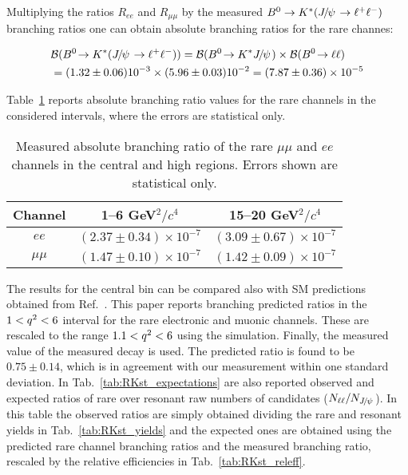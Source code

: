 Multiplying the ratios $R_{ee}$ and $R_{\mu\mu}$ by the measured $\Bz\to\Kstar (\jpsi\to\ell^+\ell^-)$~\cite{PDG2014}
branching ratios one can obtain absolute branching ratios for the rare channes:

\begin{equation}
\begin{split}
&\BR(\decay{\Bz}{\Kstar(\jpsi\to\ell^+\ell^-)}) = \BR(\decay{\Bz}{\Kstar\jpsi}) \times \BR(\decay{\Bz}{\ell\ell}) \\
& = (1.32 \pm 0.06) 10^{-3} \times (5.96 \pm 0.03) 10^{-2} = (7.87 \pm 0.36) \times 10^{-5}
\end{split}
\end{equation}

Table~\ref{tab:RKst_abs_BR} reports absolute branching ratio values for the rare channels in the considered 
\qsq intervals, where the errors are statistical only.

\begin{table}
\centering
\begin{tabular}{|c|c|c|}
\hline
 Channel 			& 1--6 GeV$^2/c^4$ & 15--20 GeV$^2/c^4$\\ \hline
$ee$ 	& $( 2.37  \pm  0.34 )\times 10^{-7}$ 	& $( 3.09  \pm  0.67 )\times 10^{-7}$ \\
 $\mu\mu$ 	& $( 1.47  \pm  0.10 )\times 10^{-7}$ 	& $( 1.42  \pm  0.09 )\times 10^{-7}$ \\
\hline 
 \end{tabular}
\caption{Measured absolute branching ratio of the rare $\mu\mu$ and $ee$ channels in
the central and high \qsq regions. Errors shown are statistical only. }
\label{tab:RKst_abs_BR}
\end{table}

The results for the central \qsq bin can be compared also with SM predictions obtained from Ref.~\cite{Ali:2002jg}.
This paper reports branching predicted ratios in the $1 < {q^2} < 6$ \gevgevcccc interval
for the rare electronic and muonic channels. These are rescaled to the range $1.1 < {q^2} < 6$ \gevgevcccc
using the simulation. Finally, the measured value of the measured \decay{\Bz}{\Kstar(\jpsi\to\ell^+\ell^-)}
decay is used. The predicted ratio is found to be $0.75 \pm 0.14$,
which is in agreement with our measurement within one standard deviation.
In Tab.~\ref{tab:RKst_expectations} are also reported observed and expected ratios of rare
over resonant raw numbers of candidates ($N_{\ell\ell} / N_{\jpsi}$). In this table the observed ratios
are simply obtained dividing the rare and resonant yields in Tab.~\ref{tab:RKst_yields}
and the expected ones are obtained using the predicted rare channel branching ratios and 
the measured \decay{\Bz}{\Kstar(\jpsi\to\ell^+\ell^-)} branching ratio, rescaled by the
relative efficiencies in Tab.~\ref{tab:RKst_releff}.  

